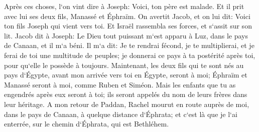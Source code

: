 \verse Après ces choses, l`on vint dire à Joseph: Voici, ton père est malade. Et il prit avec lui ses deux fils, Manassé et Éphraïm. 
\verse On avertit Jacob, et on lui dit: Voici ton fils Joseph qui vient vers toi. Et Israël rassembla ses forces, et s`assit sur son lit. 
\verse Jacob dit à Joseph: Le Dieu tout puissant m`est apparu à Luz, dans le pays de Canaan, et il m`a béni. 
\verse Il m`a dit: Je te rendrai fécond, je te multiplierai, et je ferai de toi une multitude de peuples; je donnerai ce pays à ta postérité après toi, pour qu`elle le possède à toujours. 
\verse Maintenant, les deux fils qui te sont nés au pays d`Égypte, avant mon arrivée vers toi en Égypte, seront à moi; Éphraïm et Manassé seront à moi, comme Ruben et Siméon. 
\verse Mais les enfants que tu as engendrés après eux seront à toi; ils seront appelés du nom de leurs frères dans leur héritage. 
\verse A mon retour de Paddan, Rachel mourut en route auprès de moi, dans le pays de Canaan, à quelque distance d`Éphrata; et c`est là que je l`ai enterrée, sur le chemin d`Éphrata, qui est Bethléhem. 
